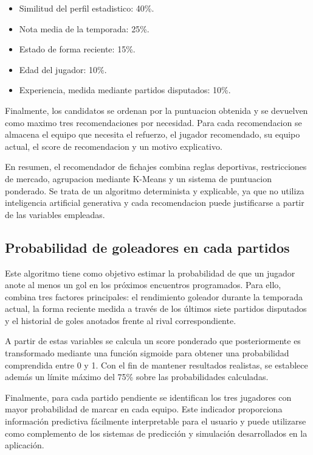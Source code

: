 \begin{itemize}
    \item Similitud del perfil estadistico: 40\%.
    \item Nota media de la temporada: 25\%.
    \item Estado de forma reciente: 15\%.
    \item Edad del jugador: 10\%.
    \item Experiencia, medida mediante partidos disputados: 10\%.
\end{itemize}

Finalmente, los candidatos se ordenan por la puntuacion obtenida y se devuelven como maximo tres recomendaciones por necesidad. Para cada recomendacion se almacena el equipo que necesita el refuerzo, el jugador recomendado, su equipo actual, el score de recomendacion y un motivo explicativo.

En resumen, el recomendador de fichajes combina reglas deportivas, restricciones de mercado, agrupacion mediante K-Means y un sistema de puntuacion ponderado. Se trata de un algoritmo determinista y explicable, ya que no utiliza inteligencia artificial generativa y cada recomendacion puede justificarse a partir de las variables empleadas.

\subsection{Probabilidad de goleadores en cada partidos}

Este algoritmo tiene como objetivo estimar la probabilidad de que un jugador anote al menos un gol en los próximos encuentros programados. Para ello, combina tres factores principales: el rendimiento goleador durante la temporada actual, la forma reciente medida a través de los últimos siete partidos disputados y el historial de goles anotados frente al rival correspondiente.

A partir de estas variables se calcula un score ponderado que posteriormente es transformado mediante una función sigmoide para obtener una probabilidad comprendida entre 0 y 1. Con el fin de mantener resultados realistas, se establece además un límite máximo del 75\% sobre las probabilidades calculadas.

Finalmente, para cada partido pendiente se identifican los tres jugadores con mayor probabilidad de marcar en cada equipo. Este indicador proporciona información predictiva fácilmente interpretable para el usuario y puede utilizarse como complemento de los sistemas de predicción y simulación desarrollados en la aplicación.

